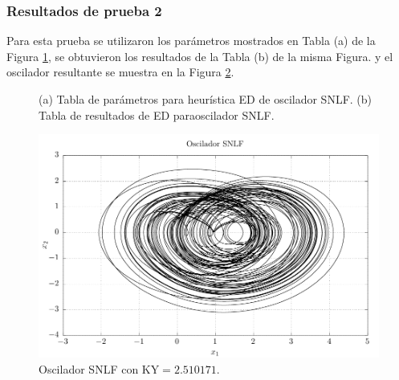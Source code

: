 \documentclass[10pt,a4paper]{article}
\begin{document}
\subsubsection{Resultados de prueba 2}
Para esta prueba se utilizaron los parámetros mostrados en Tabla (a) de la Figura \ref{fig:tabs_res2}, se obtuvieron los resultados de la Tabla (b) de la misma Figura. y el oscilador resultante se muestra en la Figura \ref{fig:res2}.
\begin{figure}[htp]
	\centering
	\hspace{2cm}
	\caption{(a) Tabla de parámetros para heurística ED de oscilador SNLF. (b) Tabla de resultados de ED paraoscilador SNLF.}
	\label{fig:tabs_res2}
\end{figure}

\begin{figure}[htp]
	\centering
	\includegraphics[width=.5\textwidth]{imagenes/super2.pdf}
	\caption{Oscilador SNLF con KY$ = 2.510171$.}
	\label{fig:res2}
\end{figure}
\end{document}
